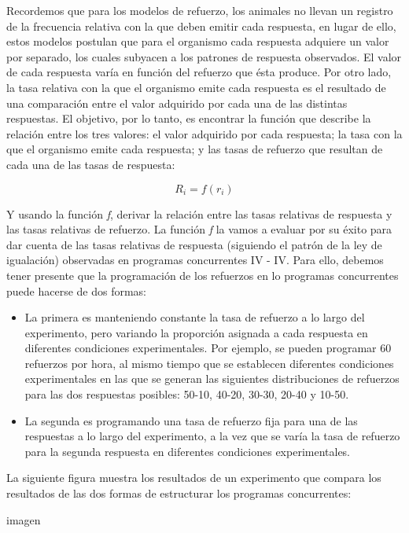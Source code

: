 \documentclass[
  a4paper,
  DIV=11,
  numbers=noendperiod]{scrreprt}
\providecommand{\tightlist}{%
  \setlength{\itemsep}{0pt}\setlength{\parskip}{0pt}}\usepackage{longtable,booktabs,array}
\begin{document}
Recordemos que para los modelos de refuerzo, los animales no llevan un
registro de la frecuencia relativa con la que deben emitir cada
respuesta, en lugar de ello, estos modelos postulan que para el
organismo cada respuesta adquiere un valor por separado, los cuales
subyacen a los patrones de respuesta observados. El valor de cada
respuesta varía en función del refuerzo que ésta produce. Por otro lado,
la tasa relativa con la que el organismo emite cada respuesta es el
resultado de una comparación entre el valor adquirido por cada una de
las distintas respuestas. El objetivo, por lo tanto, es encontrar la
función que describe la relación entre los tres valores: el valor
adquirido por cada respuesta; la tasa con la que el organismo emite cada
respuesta; y las tasas de refuerzo que resultan de cada una de las tasas
de respuesta:

\[R_i = f (r_i)\]

Y usando la función \emph{f}, derivar la relación entre las tasas
relativas de respuesta y las tasas relativas de refuerzo. La función
\emph{f} la vamos a evaluar por su éxito para dar cuenta de las tasas
relativas de respuesta (siguiendo el patrón de la ley de igualación)
observadas en programas concurrentes IV - IV. Para ello, debemos tener
presente que la programación de los refuerzos en lo programas
concurrentes puede hacerse de dos formas:

\begin{itemize}
\tightlist
\item
  La primera es manteniendo constante la tasa de refuerzo a lo largo del
  experimento, pero variando la proporción asignada a cada respuesta en
  diferentes condiciones experimentales. Por ejemplo, se pueden
  programar 60 refuerzos por hora, al mismo tiempo que se establecen
  diferentes condiciones experimentales en las que se generan las
  siguientes distribuciones de refuerzos para las dos respuestas
  posibles: 50-10, 40-20, 30-30, 20-40 y 10-50.
\item
  La segunda es programando una tasa de refuerzo fija para una de las
  respuestas a lo largo del experimento, a la vez que se varía la tasa
  de refuerzo para la segunda respuesta en diferentes condiciones
  experimentales.
\end{itemize}

La siguiente figura muestra los resultados de un experimento que compara
los resultados de las dos formas de estructurar los programas
concurrentes:

imagen
\end{document}

